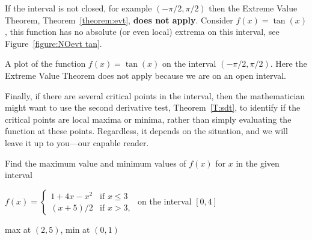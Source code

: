 \begin{warning}
If the interval is not closed, for example $(-\pi/2, \pi/2)$ then the
Extreme Value Theorem, Theorem~\ref{theorem:evt}, \textbf{does not
  apply}. Consider $f(x) = \tan(x)$, this function has no
absolute (or even local) extrema on this interval, see Figure~\ref{figure:NOevt tan}.
\end{warning}\begin{marginfigure}
\caption{A plot of the function $f(x) = \tan(x)$ on the interval
  $(-\pi/2,\pi/2)$. Here the Extreme Value Theorem does not apply
because we are on an open interval.}
\label{figure:NOevt tan}
\end{marginfigure}

Finally, if there are several critical points in the interval, then
the mathematician might want to use the second derivative test,
Theorem~\ref{T:sdt}, to identify if the critical points are local
maxima or minima, rather than simply evaluating the function at these
points. Regardless, it depends on the situation, and we will leave it
up to you---our capable reader.




\begin{exercises}
\noindent Find the maximum value and minimum values of $f(x)$ for $x$
in the given interval

\begin{exercise}
$f(x) = \begin{cases} 1 + 4 x -x^2 & \text{if  $x\leq 3$} \\ 
(x+5)/2 &\text{if $x>3$},
\end{cases}$ on the interval $[0,4]$
\begin{answer} max at $(2,5)$, min at $(0,1)$
\end{answer}\end{exercise}

\end{exercises}


















